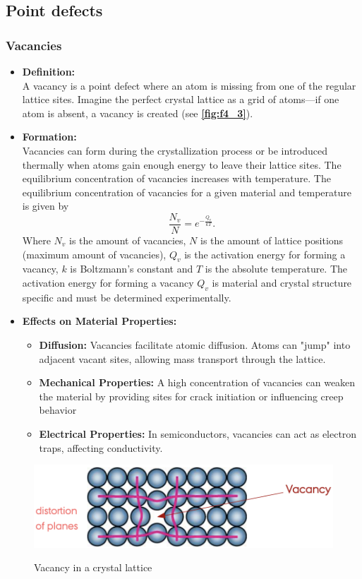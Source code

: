 \subsection{Point defects}

\subsubsection{Vacancies}
\begin{itemize}
  \item \textbf{Definition:} \\
    A vacancy is a point defect where an atom is missing from one of the regular lattice sites. Imagine the perfect crystal lattice as a grid of atoms—if one atom is absent, a vacancy is created (see \textbf{\autoref{fig:f4_3}}).
  \item \textbf{Formation:} \\
    Vacancies can form during the crystallization process or be introduced thermally when atoms gain enough energy to leave their lattice sites. The equilibrium concentration of vacancies increases with temperature. The equilibrium concentration of vacancies for a given material and temperature is given by
    \[ 
    \frac{N_v}{N} = e^{-\frac{Q_v}{kT}}
    .\]
    Where $N_v$ is the amount of vacancies, $N$ is the amount of lattice positions (maximum amount of vacancies), $Q_v$ is the activation energy for forming a vacancy, $k$ is Boltzmann's constant and $T$ is the absolute temperature. The activation energy for forming a vacancy $Q_v$ is material and crystal structure specific and must be determined experimentally. 
  \item \textbf{Effects on Material Properties:}
    \begin{itemize}
      \item \textbf{Diffusion:} Vacancies facilitate atomic diffusion. Atoms can "jump" into adjacent vacant sites, allowing mass transport through the lattice.
      \item \textbf{Mechanical Properties:} A high concentration of vacancies can weaken the material by providing sites for crack initiation or influencing creep behavior
      \item \textbf{Electrical Properties:} In semiconductors, vacancies can act as electron traps, affecting conductivity.
    \end{itemize}
\end{itemize}
\begin{figure} [ht]
  \centering
  \caption{Vacancy in a crystal lattice}
  \includegraphics[width=0.65\linewidth]{./figures/f4_3.png}
  \label{fig:f4_3}
\end{figure}


